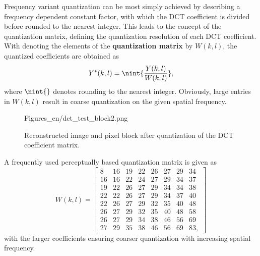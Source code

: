 Frequency variant quantization can be most simply achieved by describing a frequency dependent constant factor, with which the DCT coefficient is divided before rounded to the nearest integer.
This leads to the concept of the quantization matrix, defining the quantization resolution of each DCT coefficient.
With denoting the elements of the \textbf{quantization matrix} by $W(k,l)$, the quantized coefficients are obtained as
\begin{equation}
Y^*(k,l) = \nint{ \frac{Y(k,l)}{W(k,l)} },
\end{equation}
where $\nint{}$ denotes rounding to the nearest integer.
Obviously, large entries in $W(k,l)$ result in coarse quantization on the given spatial frequency.
%
\begin{figure}[]
	\centering
	\begin{minipage}[c]{0.75\textwidth}
	\begin{overpic}[width = 1\columnwidth ]{Figures_en/dct_test_block2.png}
	\end{overpic}   \end{minipage}\hfill
		\begin{minipage}[c]{0.23\textwidth}
	\caption{Reconstructed image and pixel block after quantization of the DCT coefficient matrix.}
	\label{Fig:2D_DCT_test_Q}  \end{minipage}
\end{figure}
A frequently used perceptually based quantization matrix is given as
\begin{equation}
W(k,l) = 
\begin{bmatrix}
	8   &  16   & 19  &  22  &  26  &  27  &  29  &  34 \\[0.3em]
    16  &  16  &  22  &  24  &  27  &  29  &  34  &  37 \\[0.3em]
    19  &  22  &  26  &  27  &  29  &  34  &  34  &  38 \\[0.3em]
    22  &  22  &  26  &  27  &  29  &  34  &  37  &  40 \\[0.3em]
    22  &  26  &  27  &  29  &  32  &  35  &  40  &  48 \\[0.3em]
    26  &  27  &  29  &  32  &  35  &  40  &  48  &  58 \\[0.3em]
    26  &  27  &  29  &  34  &  38  &  46  &  56  &  69 \\[0.3em]
    27  &  29  &  35  &  38  &  46  &  56  &  69  &  83,
\end{bmatrix}
\label{eq:Q_mx}
\end{equation}
with the larger coefficients ensuring coarser quantization with increasing spatial frequency.

